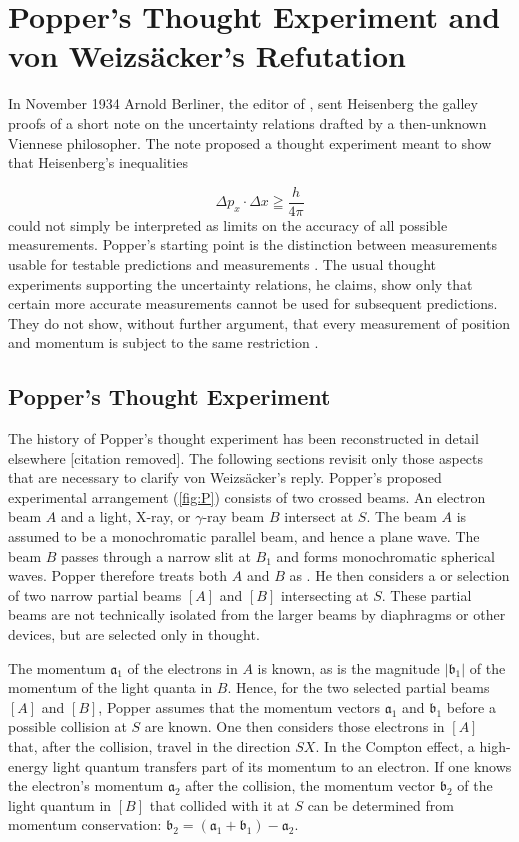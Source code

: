 \documentclass[pdflatex]{sn-jnl}
\newcommand{\UR}{uncertainty relations\xspace}
\newcommand{\vW}{von Weizsäcker\xspace}
\newcommand{\NW}{\jt{Die Naturwissenschaften}\xspace}
\newcommand{\pos}{\ensuremath{x}\xspace}
\newcommand{\mom}{\ensuremath{p_x}\xspace}
\begin{document}
\section{Popper's Thought Experiment and \vW's Refutation}
%
In November 1934 Arnold Berliner, the editor of \NW, sent Heisenberg the galley proofs of a short note on the \UR drafted by a then-unknown Viennese philosopher. The note proposed a thought experiment meant to show that Heisenberg's inequalities

\begin{equation*}
\Delta \mom \cdot \Delta \pos \geqq \frac{h}{4 \pi}
\end{equation*}
%
could not simply be interpreted as limits on the accuracy of all possible measurements. Popper's starting point is the distinction between measurements usable for testable predictions and  measurements . The usual thought experiments supporting the uncertainty relations, he claims, show only that certain more accurate measurements cannot be used for subsequent predictions. They do not show, without further argument, that every measurement of position and momentum is subject to the same restriction \citep{Popper1934}.

\subsection{Popper's Thought Experiment}

%

The history of Popper's thought experiment has been reconstructed in detail elsewhere [citation removed]. The following sections revisit only those aspects that are necessary to clarify \vW's reply. Popper's proposed experimental arrangement (\cref{fig:P}) consists of two crossed beams. An electron beam $A$ and a light, X-ray, or $\gamma$-ray beam $B$ intersect at $S$. The beam $A$ is assumed to be a monochromatic parallel beam, and hence a plane wave. The beam $B$ passes through a narrow slit at $B_1$ and forms monochromatic spherical waves. Popper therefore treats both $A$ and $B$ as  . He then considers a  or  selection of two narrow partial beams $[A]$ and $[B]$ intersecting at $S$. These partial beams are not technically isolated from the larger beams by diaphragms or other devices, but are selected only in thought.

The momentum $\mathfrak{a}_1$ of the electrons in $A$ is known, as is the magnitude $|\mathfrak{b}_1|$ of the momentum of the light quanta in $B$. Hence, for the two  selected partial beams $[A]$ and $[B]$, Popper assumes that the momentum vectors $\mathfrak{a}_1$ and $\mathfrak{b}_1$ before a possible collision at $S$ are known. One then considers those electrons in $[A]$ that, after the collision, travel in the direction $SX$. In the Compton effect, a high-energy light quantum transfers part of its momentum to an electron. If one knows the electron's momentum $\mathfrak{a}_2$ after the collision, the momentum vector $\mathfrak{b}_2$ of the light quantum in $[B]$ that collided with it at $S$ can be determined from momentum conservation: $\mathfrak{b}_2=(\mathfrak{a}_1+\mathfrak{b}_1)-\mathfrak{a}_2$.
\end{document}
